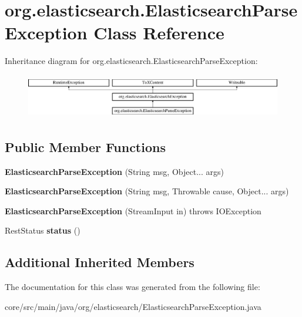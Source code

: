 \hypertarget{classorg_1_1elasticsearch_1_1_elasticsearch_parse_exception}{}\section{org.\+elasticsearch.\+Elasticsearch\+Parse\+Exception Class Reference}
\label{classorg_1_1elasticsearch_1_1_elasticsearch_parse_exception}
Inheritance diagram for org.\+elasticsearch.\+Elasticsearch\+Parse\+Exception\+:\begin{figure}[H]
\begin{center}
\leavevmode
\includegraphics[height=1.958042cm]{classorg_1_1elasticsearch_1_1_elasticsearch_parse_exception}
\end{center}
\end{figure}
\subsection*{Public Member Functions}
\begin{DoxyCompactItemize}
\item 
\hypertarget{classorg_1_1elasticsearch_1_1_elasticsearch_parse_exception_ac90702099c505ee4b3df7b8bf6f1a3a7}{}\label{classorg_1_1elasticsearch_1_1_elasticsearch_parse_exception_ac90702099c505ee4b3df7b8bf6f1a3a7} 
{\bfseries Elasticsearch\+Parse\+Exception} (String msg, Object... args)
\item 
\hypertarget{classorg_1_1elasticsearch_1_1_elasticsearch_parse_exception_abe8a105a35b164de02a5300a44c22e59}{}\label{classorg_1_1elasticsearch_1_1_elasticsearch_parse_exception_abe8a105a35b164de02a5300a44c22e59} 
{\bfseries Elasticsearch\+Parse\+Exception} (String msg, Throwable cause, Object... args)
\item 
\hypertarget{classorg_1_1elasticsearch_1_1_elasticsearch_parse_exception_ae1d448d2e7ae564405df2e54e7de6cfb}{}\label{classorg_1_1elasticsearch_1_1_elasticsearch_parse_exception_ae1d448d2e7ae564405df2e54e7de6cfb} 
{\bfseries Elasticsearch\+Parse\+Exception} (Stream\+Input in)  throws I\+O\+Exception 
\item 
\hypertarget{classorg_1_1elasticsearch_1_1_elasticsearch_parse_exception_a7efb26db2918203591653f43fb55432d}{}\label{classorg_1_1elasticsearch_1_1_elasticsearch_parse_exception_a7efb26db2918203591653f43fb55432d} 
Rest\+Status {\bfseries status} ()
\end{DoxyCompactItemize}
\subsection*{Additional Inherited Members}


The documentation for this class was generated from the following file\+:\begin{DoxyCompactItemize}
\item 
core/src/main/java/org/elasticsearch/Elasticsearch\+Parse\+Exception.\+java\end{DoxyCompactItemize}
